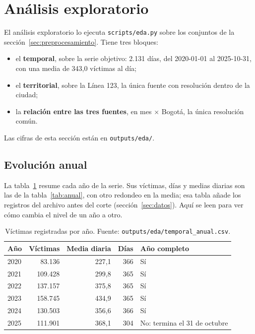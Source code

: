 
\section{Análisis exploratorio}\label{sec:eda}

El análisis exploratorio lo ejecuta \texttt{scripts/eda.py} sobre los conjuntos de la sección~\ref{sec:preprocesamiento}. Tiene tres bloques:
\begin{itemize}
  \item el \textbf{temporal}, sobre la serie objetivo: 2.131 días, del 2020-01-01 al 2025-10-31, con una media de 343,0 víctimas al día;
  \item el \textbf{territorial}, sobre la Línea 123, la única fuente con resolución dentro de la ciudad;
  \item la \textbf{relación entre las tres fuentes}, en mes $\times$ Bogotá, la única resolución común.
\end{itemize}
Las cifras de esta sección están en \texttt{outputs/eda/}.

\subsection{Evolución anual}\label{sec:eda-anual}

La tabla~\ref{tab:eda-anual} resume cada año de la serie. Sus víctimas, días y medias diarias son las de la tabla~\ref{tab:anual}, con otro redondeo en la media; esa tabla añade los registros del archivo antes del corte (sección~\ref{sec:datos}). Aquí se leen para ver cómo cambia el nivel de un año a otro.

\begin{table}[H]
\centering
\caption{Víctimas registradas por año. Fuente: \texttt{outputs/\allowbreak{}eda/\allowbreak{}temporal\_\allowbreak{}anual.csv}.}\label{tab:eda-anual}
\small
\begin{tabular}{@{}lrrrl@{}}
\toprule
\textbf{Año} & \textbf{Víctimas} & \textbf{Media diaria} & \textbf{Días} & \textbf{Año completo} \\
\midrule
2020 & 83.136 & 227,1 & 366 & Sí \\
2021 & 109.428 & 299,8 & 365 & Sí \\
2022 & 137.157 & 375,8 & 365 & Sí \\
2023 & 158.745 & 434,9 & 365 & Sí \\
2024 & 130.503 & 356,6 & 366 & Sí \\
2025 & 111.901 & 368,1 & 304 & No: termina el 31 de octubre \\
\bottomrule
\end{tabular}
\end{table}

